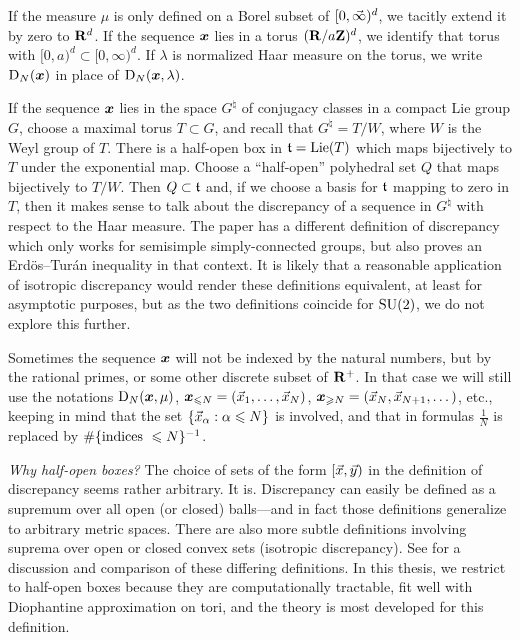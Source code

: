 If the measure $\mu$ is only defined on a Borel subset of $[0,\vec{\infty})^d$, we 
tacitly extend it by zero to $\mathbf{R}^d$. If the sequence ${\boldsymbol x}$ lies in a torus 
$(\mathbf{R}/a \mathbf{Z})^d$, we identify that torus with  $[0,a)^d\subset [0,\infty)^d$. If 
$\lambda$ is normalized Haar measure on the torus, we write $\operatorname{D}_N({\boldsymbol x})$ in 
place of $\operatorname{D}_N({\boldsymbol x}, \lambda)$. 

If the sequence ${\boldsymbol x}$ lies in the space $G^\natural$ of conjugacy classes in a 
compact Lie group $G$, choose a maximal torus $T\subset G$, and recall that 
$G^\natural = T/W$, where $W$ is the Weyl group of $T$. There is a half-open 
box in $\mathfrak{t} = \operatorname{Lie}(T)$ which maps bijectively to $T$ under the exponential 
map. Choose a ``half-open'' polyhedral set $Q$ that maps bijectively to $T/W$. 
Then $Q\subset \mathfrak{t}$ and, if we choose a basis for $\mathfrak{t}$ mapping to zero in 
$T$, then it makes sense to talk about the discrepancy of a sequence in 
$G^\natural$ with respect to the Haar measure. The paper 
\cite{rosengarten-2013} has a different definition of discrepancy which only 
works for semisimple simply-connected groups, but also proves an 
Erd\"os--Tur\'an inequality in that context. It is likely that a reasonable 
application of isotropic discrepancy would render these definitions equivalent, 
at least for asymptotic purposes, but as the two definitions coincide for 
$\operatorname{SU}(2)$, we do not explore this further. 

Sometimes the sequence ${\boldsymbol x}$ will not be indexed by the natural numbers, but 
by the rational primes, or some other discrete subset of $\mathbf{R}^+$. In that case 
we will still use the notations $\operatorname{D}_N({\boldsymbol x},\mu)$, 
${\boldsymbol x}_{\leqslant N} = (\vec{x}_1,\dots,\vec{x}_N)$, 
${\boldsymbol x}_{\geqslant N} = (\vec{x}_N,\vec{x}_{N+1},\dots)$, etc., 
keeping in mind that the set $\{\vec{x}_\alpha : \alpha \leqslant N\}$ is involved, 
and that in formulas $\frac{1}{N}$ is replaced by 
$\#\{\textnormal{indices }\leqslant N\}^{-1}$. 

\emph{Why half-open boxes?} The choice of sets of the form $[\vec{x},\vec{y})$ in the 
definition of discrepancy seems rather arbitrary. It is. Discrepancy can easily 
be defined as a supremum over all open (or closed) balls---and in fact those  
definitions generalize to arbitrary metric spaces. There are also more subtle 
definitions involving suprema over open or closed convex sets (isotropic 
discrepancy). See \cite{kuipers-niederreiter-1974} for a discussion and 
comparison of these differing definitions. In this thesis, we restrict to 
half-open boxes because they are computationally tractable, fit well with 
Diophantine approximation on tori, and the theory is most developed for this 
definition. 





